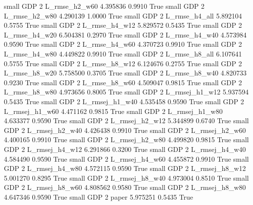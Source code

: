      small      GDP                 2  L_rmse_h2_w60   4.395836      0.9910    True
     small      GDP                 2  L_rmse_h2_w80   4.290139      1.0000    True
     small      GDP                 2  L_rmse_h4_all   5.892104      0.5755    True
     small      GDP                 2  L_rmse_h4_w12   5.829572      0.5435    True
     small      GDP                 2  L_rmse_h4_w20   6.504381      0.2970    True
     small      GDP                 2  L_rmse_h4_w40   4.573984      0.9590    True
     small      GDP                 2  L_rmse_h4_w60   4.370723      0.9910    True
     small      GDP                 2  L_rmse_h4_w80   4.449822      0.9910    True
     small      GDP                 2  L_rmse_h8_all   6.107641      0.5755    True
     small      GDP                 2  L_rmse_h8_w12   6.124676      0.2755    True
     small      GDP                 2  L_rmse_h8_w20   5.758500      0.3705    True
     small      GDP                 2  L_rmse_h8_w40   4.820733      0.9230    True
     small      GDP                 2  L_rmse_h8_w60   4.509047      0.9815    True
     small      GDP                 2  L_rmse_h8_w80   4.973656      0.8005    True
     small      GDP                 2 L_rmsej_h1_w12   5.937594      0.5435    True
     small      GDP                 2 L_rmsej_h1_w40   4.535458      0.9590    True
     small      GDP                 2 L_rmsej_h1_w60   4.471162      0.9815    True
     small      GDP                 2 L_rmsej_h1_w80   4.633377      0.9590    True
     small      GDP                 2 L_rmsej_h2_w12   5.344899      0.6740    True
     small      GDP                 2 L_rmsej_h2_w40   4.426438      0.9910    True
     small      GDP                 2 L_rmsej_h2_w60   4.400165      0.9910    True
     small      GDP                 2 L_rmsej_h2_w80   4.499820      0.9815    True
     small      GDP                 2 L_rmsej_h4_w12   6.291866      0.3200    True
     small      GDP                 2 L_rmsej_h4_w40   4.584490      0.9590    True
     small      GDP                 2 L_rmsej_h4_w60   4.455872      0.9910    True
     small      GDP                 2 L_rmsej_h4_w80   4.572115      0.9590    True
     small      GDP                 2 L_rmsej_h8_w12   5.001270      0.8295    True
     small      GDP                 2 L_rmsej_h8_w40   4.973004      0.8510    True
     small      GDP                 2 L_rmsej_h8_w60   4.808562      0.9580    True
     small      GDP                 2 L_rmsej_h8_w80   4.647346      0.9590    True
     small      GDP                 2          paper   5.975251      0.5435    True
